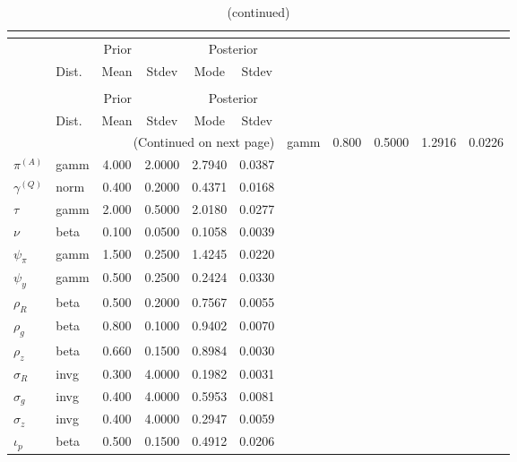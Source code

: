  
\begin{center}
\begin{longtable}{llcccc} 
\caption{Results from posterior maximization (parameters)}\\
 \label{Table:Posterior:1}\\
\toprule 
  & \multicolumn{3}{c}{Prior}  &  \multicolumn{2}{c}{Posterior} \\
  \cmidrule(r{.75em}){2-4} \cmidrule(r{.75em}){5-6}
  & Dist. & Mean  & Stdev & Mode & Stdev \\ 
\midrule \endfirsthead 
\caption{(continued)}\\
 \bottomrule 
  & \multicolumn{3}{c}{Prior}  &  \multicolumn{2}{c}{Posterior} \\
  \cmidrule(r{.75em}){2-4} \cmidrule(r{.75em}){5-6}
  & Dist. & Mean  & Stdev & Mode & Stdev \\ 
\midrule \endhead 
\bottomrule \multicolumn{6}{r}{(Continued on next page)}\endfoot 
\bottomrule\endlastfoot 
${r_{A}}$ & gamm &   0.800 & 0.5000 &   1.2916 &  0.0226 \\ 
${\pi^{(A)}}$ & gamm &   4.000 & 2.0000 &   2.7940 &  0.0387 \\ 
${\gamma^{(Q)}}$ & norm &   0.400 & 0.2000 &   0.4371 &  0.0168 \\ 
${\tau}$ & gamm &   2.000 & 0.5000 &   2.0180 &  0.0277 \\ 
${\nu}$ & beta &   0.100 & 0.0500 &   0.1058 &  0.0039 \\ 
${\psi_\pi}$ & gamm &   1.500 & 0.2500 &   1.4245 &  0.0220 \\ 
${\psi_y}$ & gamm &   0.500 & 0.2500 &   0.2424 &  0.0330 \\ 
${\rho_R}$ & beta &   0.500 & 0.2000 &   0.7567 &  0.0055 \\ 
${\rho_{g}}$ & beta &   0.800 & 0.1000 &   0.9402 &  0.0070 \\ 
${\rho_z}$ & beta &   0.660 & 0.1500 &   0.8984 &  0.0030 \\ 
${\sigma_R}$ & invg &   0.300 & 4.0000 &   0.1982 &  0.0031 \\ 
${\sigma_{g}}$ & invg &   0.400 & 4.0000 &   0.5953 &  0.0081 \\ 
${\sigma_z}$ & invg &   0.400 & 4.0000 &   0.2947 &  0.0059 \\ 
${\iota_p}$ & beta &   0.500 & 0.1500 &   0.4912 &  0.0206 \\ 
\end{longtable}
 \end{center}
